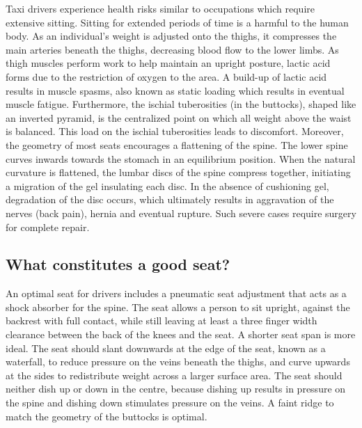 \documentclass[11pt]{article}
\begin{document}
Taxi drivers experience health risks similar to occupations which require extensive sitting. 
Sitting for extended periods of time is a harmful to the human body. As an individual's weight is adjusted
onto the thighs, it compresses the main arteries beneath the thighs, decreasing 
blood flow to the lower limbs. As thigh muscles perform work to help maintain an upright posture, 
lactic acid forms due to the restriction of oxygen to the area. A build-up of lactic acid results in muscle spasms, also known as static
loading which results in eventual muscle fatigue. Furthermore, the ischial 
tuberosities (in the buttocks), shaped like an inverted pyramid, is the centralized point on which all weight above the waist  
is balanced. This load on the ischial tuberosities leads to discomfort. Moreover, the geometry of most seats encourages a flattening of the 
spine. The lower spine curves inwards towards the stomach in an equilibrium position. When the natural curvature 
is flattened, the lumbar discs of the spine compress together, initiating a migration of 
the gel insulating each disc. In the absence of cushioning gel, degradation of the disc occurs, which 
ultimately results in aggravation of the nerves (back pain), hernia and eventual rupture. Such severe cases
require surgery for complete repair\cite{ergoCentricAnatomy2011}.

\subsection{What constitutes a good seat?}
An optimal seat for drivers includes a pneumatic seat adjustment that acts as a shock absorber for the spine. The seat 
allows a person to sit upright, against the backrest with full contact, while still leaving at least a 
three finger width clearance between the back of the knees and the seat. A shorter seat span is more ideal. 
The seat should slant downwards at the edge of the seat, known as a waterfall, to reduce pressure on the veins 
beneath the thighs, and curve upwards at the sides to redistribute weight across a larger surface area. 
The seat should neither dish 
up or down in the centre, because dishing up results in pressure on the spine and dishing down stimulates pressure on the veins. 
A faint ridge to match the geometry of the buttocks is optimal\cite{ergoCentricchair2011, Natpost2005}.
\end{document}
